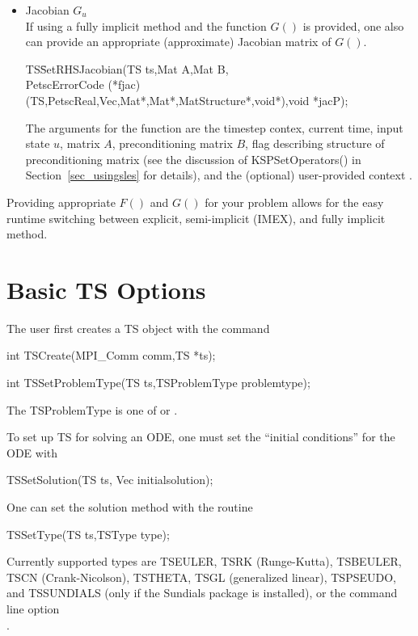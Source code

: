 \begin{itemize}
\item Jacobian $G_u$ \\
  If using a fully implicit method and the function $ G() $ is provided, one also can provide an appropriate (approximate) Jacobian matrix of $G()$.
  \begin{tabbing}
    TS\=SetRHSJacobian(TS ts,Mat A,Mat B,\\
    \>PetscErrorCode (*fjac)(TS,PetscReal,Vec,Mat*,Mat*,MatStructure*,void*),void *jacP);
  \end{tabbing}
  The arguments for the function 
  are the timestep contex, current time, input state $u$, matrix $A$, preconditioning matrix
  $B$, flag describing structure of preconditioning matrix (see the
  discussion of KSPSetOperators() in Section~\ref{sec_usingsles} for
  details), and the (optional) user-provided context .
\end{itemize}

Providing appropriate $ F() $ and $G() $ for your problem allows for the easy runtime switching between explicit, semi-implicit (IMEX), and fully implicit method.

\section{Basic TS Options}

The user first creates a TS object with the command
\begin{tabbing}
  int TSCreate(MPI\_Comm comm,TS *ts);
\end{tabbing}

\begin{tabbing}
  int TSSetProblemType(TS ts,TSProblemType problemtype);
\end{tabbing}
The TSProblemType
is one of  or .

\noindent To set up TS for solving an ODE, one must set the ``initial conditions'' for the ODE with
\begin{tabbing}
 TSSetSolution(TS ts, Vec initialsolution);
\end{tabbing}

\noindent One can set the solution method with the routine
\begin{tabbing}
 TSSetType(TS ts,TSType type);
\end{tabbing}
Currently supported types are TSEULER, TSRK (Runge-Kutta), 
TSBEULER, TSCN (Crank-Nicolson), TSTHETA, TSGL (generalized linear), TSPSEUDO, and  
TSSUNDIALS (only if the Sundials package is installed),  
or the command line option \\
.
 


